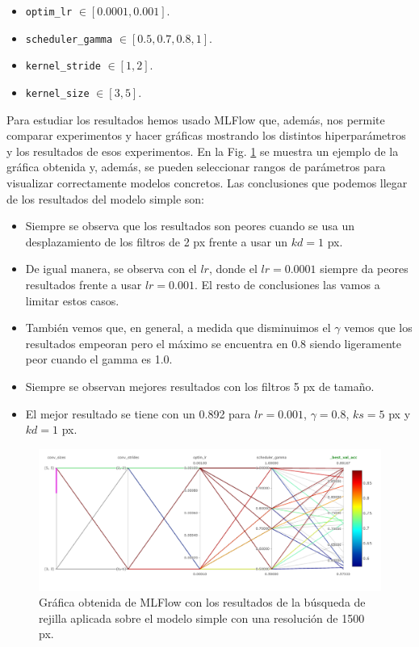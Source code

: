 \documentclass[a4paper,12pt,oneside,titlepage]{book}
\newcommand{\inline}[1]{\texttt{#1}}
\begin{document}
\begin{itemize}
  \item \inline{optim_lr} $\in \left[0.0001, 0.001\right]$.
  \item \inline{scheduler_gamma} $\in \left[0.5, 0.7, 0.8, 1\right]$.
  \item \inline{kernel_stride} $\in \left[1, 2\right]$.
  \item \inline{kernel_size} $\in \left[3, 5\right]$.
\end{itemize}

Para estudiar los resultados hemos usado MLFlow que, además, nos permite comparar experimentos y hacer gráficas mostrando los distintos hiperparámetros y los resultados de esos experimentos. En la Fig. \ref{fig:estudio_kernel} se muestra un ejemplo de la gráfica obtenida y, además, se pueden seleccionar rangos de parámetros para visualizar correctamente modelos concretos. Las conclusiones que podemos llegar de los resultados del modelo simple son:
 
\begin{itemize}
  \item Siempre se observa que los resultados son peores cuando se usa un desplazamiento de los filtros de 2 px frente a usar un $kd = 1$ px.
  \item De igual manera, se observa con el $lr$, donde el $lr = 0.0001$ siempre da peores resultados frente a usar $lr = 0.001$. El resto de conclusiones las vamos a limitar estos casos.
  \item También vemos que, en general, a medida que disminuimos el $\gamma$ vemos que los resultados empeoran pero el máximo se encuentra en 0.8 siendo ligeramente peor cuando el gamma es 1.0.
  \item Siempre se observan mejores resultados con los filtros 5 px de tamaño.
  \item El mejor resultado se tiene con un 0.892 para $lr = 0.001$, $\gamma = 0.8$, $ks = 5$ px y $kd = 1$ px.
\end{itemize}

\begin{figure}[h!]
  \centering
  \includegraphics[scale=0.65, center]{studio_kernel_simple.PNG}
  \caption{Gráfica obtenida de MLFlow con los resultados de la búsqueda de rejilla aplicada sobre el modelo simple con una resolución de 1500 px.}
  \label{fig:estudio_kernel}
\end{figure}
 
\end{document}
